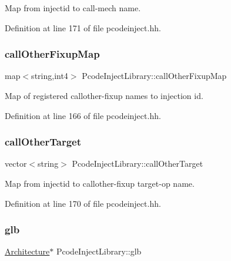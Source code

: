 Map from injectid to call-\/mech name. 



Definition at line 171 of file pcodeinject.\+hh.

\mbox{\label{class_pcode_inject_library_a7bc738dd5cedca8a28dad33fac7629b6}} 
\subsubsection{\texorpdfstring{callOtherFixupMap}{callOtherFixupMap}}
{\footnotesize\ttfamily map$<$string,int4$>$ Pcode\+Inject\+Library\+::call\+Other\+Fixup\+Map\hspace{0.3cm}{\ttfamily [protected]}}



Map of registered callother-\/fixup names to injection id. 



Definition at line 166 of file pcodeinject.\+hh.

\mbox{\label{class_pcode_inject_library_aac7dd876176633699593928163eb9336}} 
\subsubsection{\texorpdfstring{callOtherTarget}{callOtherTarget}}
{\footnotesize\ttfamily vector$<$string$>$ Pcode\+Inject\+Library\+::call\+Other\+Target\hspace{0.3cm}{\ttfamily [protected]}}



Map from injectid to callother-\/fixup target-\/op name. 



Definition at line 170 of file pcodeinject.\+hh.

\mbox{\label{class_pcode_inject_library_a132ab1eb8c759a0cfaa78ad1b25f5b8b}} 
\subsubsection{\texorpdfstring{glb}{glb}}
{\footnotesize\ttfamily \mbox{\hyperlink{class_architecture}{Architecture}}$\ast$ Pcode\+Inject\+Library\+::glb\hspace{0.3cm}{\ttfamily [protected]}}



